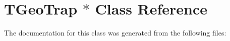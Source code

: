 \hypertarget{class_t_geo_trap_01_5}{
\section{TGeoTrap $\ast$ Class Reference}
\label{class_t_geo_trap_01_5}
}


The documentation for this class was generated from the following files:
